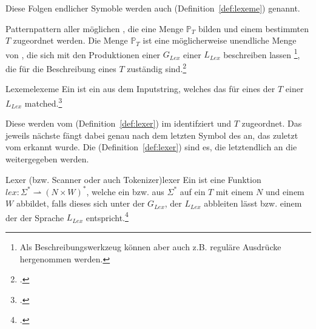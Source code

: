 Diese Folgen endlicher Symoble werden auch  (Definition~\ref{def:lexeme}) genannt.

\begin{Definition}{Pattern}{pattern}
   aller möglichen , die eine Menge $\mathbb{P}_{T}$ bilden und einem bestimmten  $T$ zugeordnet werden.
  Die Menge $\mathbb{P}_{T}$ ist eine möglicherweise unendliche Menge von , die sich mit den Produktionen einer  ${G}_{Lex}$ einer  ${L}_{Lex}$ beschreiben lassen \footnote{Als Beschreibungswerkzeug können aber auch z.B. reguläre Ausdrücke hergenommen werden.}, die für die Beschreibung eines  $T$ zuständig sind.\footcite{thiemann_compilerbau_2021}
\end{Definition}

\begin{Definition}{Lexeme}{lexeme}
  Ein  ist ein  aus dem Inputstring, welches das  für eines der  $T$ einer  ${L}_{Lex}$ matched.\footcite{thiemann_compilerbau_2021}
\end{Definition}

Diese  werden vom  (Definition~\ref{def:lexer}) im  identifziert und  $T$ zugeordnet. Das jeweils nächste  fängt dabei genau nach dem letzten Symbol des  an, das zuletzt vom  erkannt wurde. Die  (Definition~\ref{def:lexer}) sind es, die letztendlich an die  weitergegeben werden.

\begin{Definition}{Lexer (bzw. Scanner oder auch Tokenizer)}{lexer}
  Ein  ist eine  Funktion \hspace{0.2cm}$lex: \Sigma^{*} \rightharpoonup (N \times W)^{*}$, welche ein  bzw.  aus $\Sigma^{*}$ auf ein  $T$ mit einem  $N$ und einem  $W$ abbildet, falls dieses  sich unter der  ${G}_{Lex}$, der  ${L_{Lex}}$ abbleiten lässt bzw. einem der  der Sprache $L_{Lex}$ entspricht.\footcite{thiemann_compilerbau_2021}
\end{Definition}

